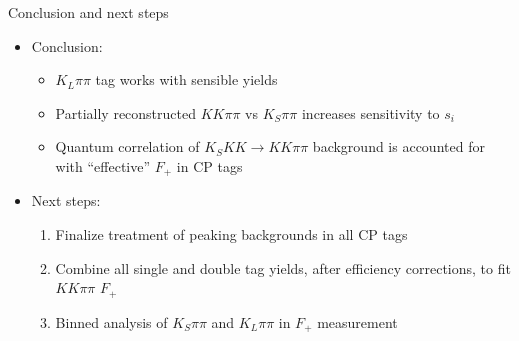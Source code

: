 \documentclass{beamer}
\begin{document}
\begin{frame}{Conclusion and next steps}
  \begin{itemize}
    \setlength\itemsep{1.5em}
    \item{Conclusion:}
    \begin{itemize}
    \setlength\itemsep{0.5em}
      \item{$K_L\pi\pi$ tag works with sensible yields}
      \item{Partially reconstructed $KK\pi\pi$ vs $K_S\pi\pi$ increases sensitivity to $s_i$}
      \item{Quantum correlation of $K_SKK\to KK\pi\pi$ background is accounted for with ``effective'' $F_+$ in CP tags}
    \end{itemize}
    \item{Next steps:}
    \begin{enumerate}
    \setlength\itemsep{0.5em}
      \item{Finalize treatment of peaking backgrounds in all CP tags}
      \item{Combine all single and double tag yields, after efficiency corrections, to fit $KK\pi\pi$ $F_+$}
      \item{Binned analysis of $K_S\pi\pi$ and $K_L\pi\pi$ in $F_+$ measurement}
    \end{enumerate}
  \end{itemize}
\end{frame}
\end{document}
